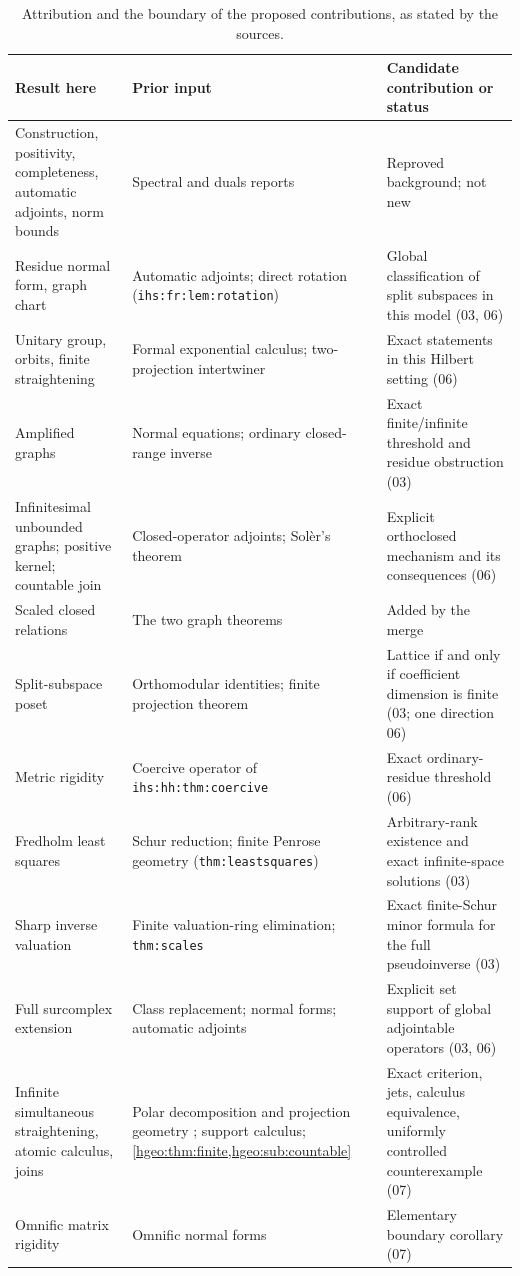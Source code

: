 \documentclass[11pt,letterpaper]{article}
\numberwithin{equation}{section}
\theoremstyle{definition}
\theoremstyle{remark}
\newcommand{\replabel}[1]{\nolinkurl{#1}}
\begin{document}
\begin{table}[!ht]
\centering\small
\caption{Attribution and the boundary of the proposed contributions, as
stated by the sources.}\label{hgeo:tab:attribution}
\begin{tabularx}{\textwidth}{@{}>{\raggedright\arraybackslash}p{}YY@{}}
\toprule
Result here & Prior input & Candidate contribution or status\\
\midrule
Construction, positivity, completeness, automatic adjoints, norm bounds
 & Spectral and duals reports
 & Reproved background; not new\\
Residue normal form, graph chart
 & Automatic adjoints; direct rotation (\replabel{ihs:fr:lem:rotation})
 & Global classification of split subspaces in this model (03, 06)\\
Unitary group, orbits, finite straightening
 & Formal exponential calculus; two-projection intertwiner
 & Exact statements in this Hilbert setting (06)\\
Amplified graphs
 & Normal equations; ordinary closed-range inverse
 & Exact finite/infinite threshold and residue obstruction (03)\\
Infinitesimal unbounded graphs; positive kernel; countable join
 & Closed-operator adjoints; Sol\`er's theorem
 & Explicit orthoclosed mechanism and its consequences (06)\\
Scaled closed relations
 & The two graph theorems
 & Added by the merge\\
Split-subspace poset
 & Orthomodular identities; finite projection theorem
 & Lattice if and only if coefficient dimension is finite (03; one direction 06)\\
Metric rigidity
 & Coercive operator of \replabel{ihs:hh:thm:coercive}
 & Exact ordinary-residue threshold (06)\\
Fredholm least squares
 & Schur reduction; finite Penrose geometry (\replabel{thm:leastsquares})
 & Arbitrary-rank existence and exact infinite-space solutions (03)\\
Sharp inverse valuation
 & Finite valuation-ring elimination; \replabel{thm:scales}
 & Exact finite-Schur minor formula for the full pseudoinverse (03)\\
Full surcomplex extension
 & Class replacement; normal forms; automatic adjoints
 & Explicit set support of global adjointable operators (03, 06)\\
Infinite simultaneous straightening, atomic calculus, joins
 & Polar decomposition and projection geometry
 \cite{Kato,CorachMaestripieri}; support calculus;
 \cref{hgeo:thm:finite,hgeo:sub:countable}
 & Exact criterion, jets, calculus equivalence, uniformly controlled
 counterexample (07)\\
Omnific matrix rigidity
 & Omnific normal forms \cite{LInnocenteMantova}
 & Elementary boundary corollary (07)\\
\bottomrule
\end{tabularx}
\end{table}
\end{document}
